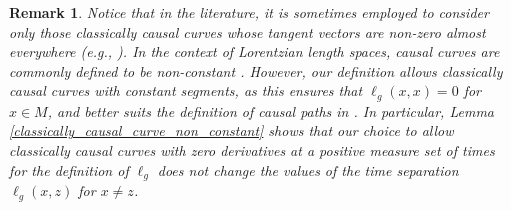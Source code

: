 \documentclass[a4paper,10pt]{article}
\newtheorem{remark}[theorem]{Remark}
\numberwithin{equation}{section}
\begin{document}
\begin{remark}\label{causal_curves_constant_remark}
    Notice that in the literature, it is sometimes employed to consider only those classically causal curves whose tangent vectors are non-zero almost everywhere (e.g., \cite{samann2016global}). In the context of Lorentzian length spaces, causal curves are commonly defined to be non-constant \cite{kunzinger2018lorentzian, cavalletti2020optimal}. However, our definition allows classically causal curves with constant segments, as this ensures that $\ell_g(x, x)=0$ for $x \in M$,  and better suits the definition of causal paths in \cite{beran2024nonlinear}. In particular, Lemma \ref{classically_causal_curve_non_constant} shows that our choice to allow classically causal curves with zero derivatives at a positive measure set of times for the definition of $\ell_g$ does not change the values of the time separation $\ell_g(x, z)$ for $x \neq z$.
\end{remark}
\smallskip
\end{document}

